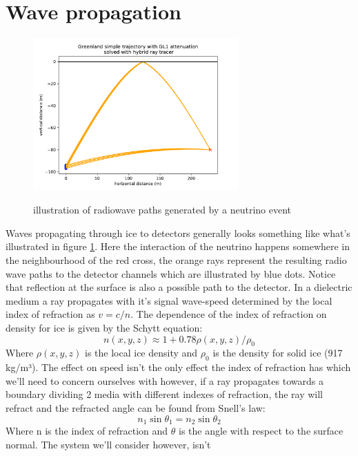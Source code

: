 \documentclass[11pt,a4paper,faculty=we,language=en,doctype=report]{cls/ugent-doc}
\begin{document}
\section{Wave propagation}
\begin{figure}[h!]
	\centering
	\includegraphics[width=0.7\textwidth]{Path_illu.pdf}
	\label{fig:PathIllu}
	\caption{illustration of radiowave paths generated by a neutrino event}
\end{figure}
Waves propagating through ice to detectors generally looks something like
what's illustrated in figure \ref{fig:PathIllu}.  Here the interaction of the
neutrino happens somewhere in the neighbourhood of the red cross, the orange
rays represent the resulting radio wave paths to the detector channels which are
illustrated by blue dots. Notice that reflection at the surface is also a
possible path to the detector.  In a dielectric medium a ray
propagates with it's signal wave-speed determined by the local index
of refraction as $v = c/n$. 
The dependence of the index of refraction on
density for ice is given by the Schytt equation:
\begin{equation}
	n(x,y,z) \approx 1 + 0.78\rho(x,y,z)/\rho_0
\end{equation}
Where $\rho(x,y,z)$ is the local ice density and $\rho_0$ is the density for
solid ice (917 kg/m³).  The effect on speed isn't the only effect the index of
refraction has which we'll need to concern ourselves with however, if a ray
propagates towards a boundary dividing 2 media with different indexes of
refraction, the ray will refract and the refracted angle can be found from
Snell's law:
\begin{equation}
	n_1\sin{\theta_1} = n_2\sin{\theta_2}
\end{equation}
Where n is the index of refraction and $\theta$ is the angle
with respect to the surface normal.
The system we'll consider however, isn't 
\end{document}
